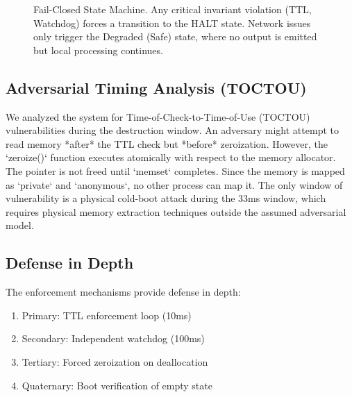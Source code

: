 \documentclass[conference]{IEEEtran}
\begin{document}
\begin{figure}[htbp]
\centering
{}
\caption{Fail-Closed State Machine. Any critical invariant violation (TTL, Watchdog) forces a transition to the HALT state. Network issues only trigger the Degraded (Safe) state, where no output is emitted but local processing continues.}
\label{fig:states}
\end{figure}

\subsection{Adversarial Timing Analysis (TOCTOU)}
We analyzed the system for Time-of-Check-to-Time-of-Use (TOCTOU) vulnerabilities during the destruction window. An adversary might attempt to read memory *after* the TTL check but *before* zeroization.
However, the `zeroize()` function executes atomically with respect to the memory allocator. The pointer is not freed until `memset` completes. Since the memory is mapped as `private` and `anonymous`, no other process can map it. The only window of vulnerability is a physical cold-boot attack during the 33ms window, which requires physical memory extraction techniques outside the assumed adversarial model.

\subsection{Defense in Depth}
The enforcement mechanisms provide defense in depth:
\begin{enumerate}
    \item Primary: TTL enforcement loop (10ms)
    \item Secondary: Independent watchdog (100ms)
    \item Tertiary: Forced zeroization on deallocation
    \item Quaternary: Boot verification of empty state
\end{enumerate}
\end{document}
